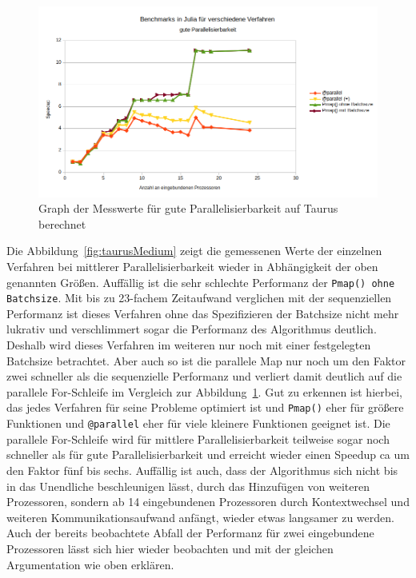 \documentclass[proseminar,german,utf8]{zihpub}
\begin{document}
\begin{figure}
    \centering
    \includegraphics[scale=1, width=17cm]{bilder/parallel_performance_taurus_good.png} 
    \caption{Graph der Messwerte für gute Parallelisierbarkeit auf Taurus berechnet}
    \label{fig:taurusGood}
\end{figure}

Die Abbildung~\ref{fig:taurusMedium} zeigt die gemessenen Werte der einzelnen Verfahren bei mittlerer Parallelisierbarkeit wieder in Abhängigkeit der oben genannten Größen. Auffällig ist die sehr schlechte Performanz der \verb|Pmap() ohne Batchsize|. Mit bis zu 23-fachem Zeitaufwand verglichen mit der sequenziellen Performanz ist dieses Verfahren ohne das Spezifizieren der Batchsize nicht mehr lukrativ und verschlimmert sogar die Performanz des Algorithmus deutlich. Deshalb wird dieses Verfahren im weiteren nur noch mit einer festgelegten Batchsize betrachtet. Aber auch so ist die parallele Map nur noch um den Faktor zwei schneller als die sequenzielle Performanz und verliert damit deutlich auf die parallele For-Schleife im Vergleich zur Abbildung~\ref{fig:taurusGood}. Gut zu erkennen ist hierbei, das jedes Verfahren für seine Probleme optimiert ist und \verb|Pmap()| eher für größere Funktionen und \verb|@parallel| eher für viele kleinere Funktionen geeignet ist. Die parallele For-Schleife wird für mittlere Parallelisierbarkeit teilweise sogar noch schneller als für gute Parallelisierbarkeit und erreicht wieder einen Speedup ca um den Faktor fünf bis sechs. Auffällig ist auch, dass der Algorithmus sich nicht bis in das Unendliche beschleunigen lässt, durch das Hinzufügen von weiteren Prozessoren, sondern ab 14 eingebundenen Prozessoren durch Kontextwechsel und weiteren Kommunikationsaufwand anfängt, wieder etwas langsamer zu werden. Auch der bereits beobachtete Abfall der Performanz für zwei eingebundene Prozessoren lässt sich hier wieder beobachten und mit der gleichen Argumentation wie oben erklären.
\end{document}
